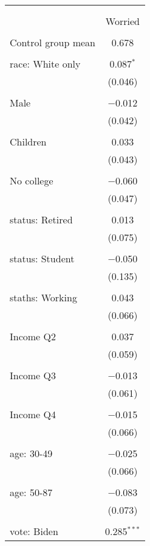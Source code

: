 
\begin{tabular}{@{\extracolsep{5pt}}lc} 
\\[-1.8ex]\hline 
\hline \\[-1.8ex] 
\\[-1.8ex] & Worried \\ 
\hline \\[-1.8ex] 
 Control group mean & 0.678  \\ \hline \\[-1.8ex] race: White only & 0.087$^{*}$ \\ 
  & (0.046) \\ 
  & \\ 
 Male & $-$0.012 \\ 
  & (0.042) \\ 
  & \\ 
 Children & 0.033 \\ 
  & (0.043) \\ 
  & \\ 
 No college & $-$0.060 \\ 
  & (0.047) \\ 
  & \\ 
 status: Retired & 0.013 \\ 
  & (0.075) \\ 
  & \\ 
 status: Student & $-$0.050 \\ 
  & (0.135) \\ 
  & \\ 
 staths: Working & 0.043 \\ 
  & (0.066) \\ 
  & \\ 
 Income Q2 & 0.037 \\ 
  & (0.059) \\ 
  & \\ 
 Income Q3 & $-$0.013 \\ 
  & (0.061) \\ 
  & \\ 
 Income Q4 & $-$0.015 \\ 
  & (0.066) \\ 
  & \\ 
 age: 30-49 & $-$0.025 \\ 
  & (0.066) \\ 
  & \\ 
 age: 50-87 & $-$0.083 \\ 
  & (0.073) \\ 
  & \\ 
 vote: Biden & 0.285$^{***}$ \\ 

\end{tabular}
